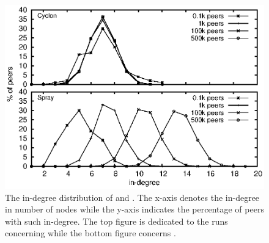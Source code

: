 \begin{figure}
  \centering
  \includegraphics[width=\textwidth]{img/spray/histo.eps}
  \caption{\label{fig:histo}The in-degree distribution of \CYCLON and
    \SPRAY. The x-axis denotes the in-degree in number of nodes while the
    y-axis indicates the percentage of peers with such in-degree. The top
    figure is dedicated to the runs concerning \CYCLON while the bottom figure
    concerns \SPRAY.}
\end{figure}

